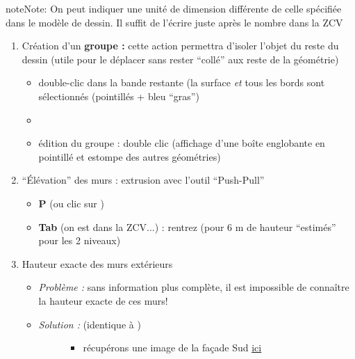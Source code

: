 \documentclass[a4paper,12pt,french]{sphinxmanual}
\begin{document}
\begin{notice}{note}{Note:}
On peut indiquer une unité de dimension différente de celle spécifiée dans le modèle de dessin. Il suffit de l'écrire juste après le nombre dans la ZCV
\end{notice}
\begin{enumerate}
\item {} 
Création d'un \textbf{groupe :} cette action permettra d'isoler l'objet du reste du dessin (utile pour le déplacer sans rester ``collé'' aux reste de la géométrie)
\begin{itemize}
\item {} 
double-clic dans la bande restante (la surface \emph{et} tous les bords sont sélectionnés (pointillés + bleu ``gras'')

\item {} 

\item {} 
édition du groupe : double clic (affichage d'une boîte englobante en pointillé et estompe des autres géométries)

\end{itemize}

\item {} 
``Élévation'' des murs : extrusion avec l'outil ``Push-Pull''
\begin{itemize}
\item {} 
\textbf{P} (ou clic sur )

\item {} 
\textbf{Tab} (on est dans la ZCV...) : rentrez  (pour 6 m de hauteur ``estimés'' pour les 2 niveaux)

\end{itemize}

\item {} 
Hauteur exacte des murs extérieurs
\begin{itemize}
\item {} 
\emph{Problème :} sans information plus complète, il est impossible de connaître la hauteur exacte de ces murs!

\item {} \begin{description}
\item[{\emph{Solution :} (identique à {\hyperref[su/import\string-ssqu:import\string-ssqu]{}})}] \leavevmode\begin{itemize}
\item {} 
récupérons une image de la façade Sud \href{http://www.canopee.org/fichiers/teb-d/aides/acad/init\_su+acad/dessins/pdf/fixhaus\_Berchtold-Typ2\_fac-sud.pdf}{ici}


\end{itemize}
\end{description}
\end{itemize}
\end{enumerate}
\end{document}
